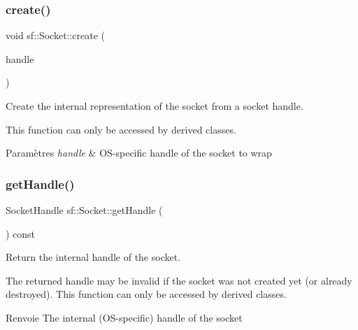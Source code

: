 \subsubsection{\texorpdfstring{create()}{create()}\hspace{0.1cm}{\footnotesize\ttfamily [2/2]}}
{\footnotesize\ttfamily void sf\+::\+Socket\+::create (\begin{DoxyParamCaption}\item[{Socket\+Handle}]{handle }\end{DoxyParamCaption})\hspace{0.3cm}{\ttfamily [protected]}}



Create the internal representation of the socket from a socket handle. 

This function can only be accessed by derived classes.


\begin{DoxyParams}{Paramètres}
{\em handle} & O\+S-\/specific handle of the socket to wrap \\
\hline
\end{DoxyParams}
\mbox{\label{classsf_1_1Socket_a675457784284ae2f5640bbbe16729393}} 
\subsubsection{\texorpdfstring{get\+Handle()}{getHandle()}}
{\footnotesize\ttfamily Socket\+Handle sf\+::\+Socket\+::get\+Handle (\begin{DoxyParamCaption}{ }\end{DoxyParamCaption}) const\hspace{0.3cm}{\ttfamily [protected]}}



Return the internal handle of the socket. 

The returned handle may be invalid if the socket was not created yet (or already destroyed). This function can only be accessed by derived classes.

\begin{DoxyReturn}{Renvoie}
The internal (O\+S-\/specific) handle of the socket 
\end{DoxyReturn}
\mbox{\label{classsf_1_1Socket_ab1ceca9ac114b8baeeda3b34a0aca468}} 
